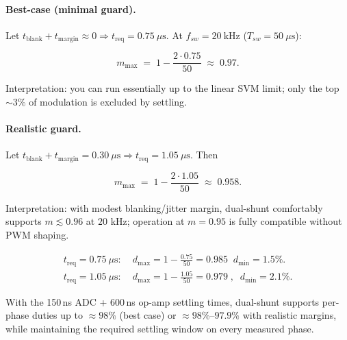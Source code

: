 \documentclass[conference]{IEEEtran}
\begin{document}
\paragraph*{Best-case (minimal guard).}
Let \(t_{\mathrm{blank}}{+}t_{\mathrm{margin}}\!\approx\!0 \Rightarrow t_{\mathrm{req}}=0.75~\mu\text{s}\).
At \(f_{sw}=20~\text{kHz}\) (\(T_{sw}=50~\mu\text{s}\)):

\begin{equation}
m_{\max} \;=\; 1 - \frac{2\cdot 0.75}{50} \;\approx\; \mathbf{0.97}.
\end{equation}

Interpretation: you can run essentially up to the linear SVM limit; only the top \(\sim\!3\%\) of modulation is excluded by settling.

\paragraph*{Realistic guard.}
Let \(t_{\mathrm{blank}}{+}t_{\mathrm{margin}}=0.30~\mu\text{s} \Rightarrow t_{\mathrm{req}}=1.05~\mu\text{s}\).
Then

\begin{equation}
m_{\max} \;=\; 1 - \frac{2\cdot 1.05}{50} \;\approx\; \mathbf{0.958}.
\end{equation}

Interpretation: with modest blanking/jitter margin, dual-shunt comfortably supports \(m\!\lesssim\!0.96\) at \(20\) kHz; operation at \(m=0.95\) is fully compatible without PWM shaping.

\begin{equation}
\begin{aligned}
t_{\mathrm{req}}=0.75~\mu\text{s}: \;& d_{\max}=1-\tfrac{0.75}{50}=0.985\;\; d_{\min}=1.5\%.\\
t_{\mathrm{req}}=1.05~\mu\text{s}: \;& d_{\max}=1-\tfrac{1.05}{50}=0.979\;,\;\; d_{\min}=2.1\%.
\end{aligned}
\end{equation}

With the 150\,ns ADC + 600\,ns op-amp settling times, dual-shunt supports per-phase duties up to \(\approx98\%\) (best case) or \(\approx98\%\)–\(97.9\%\) with realistic margins, while maintaining the required settling window on every measured phase.
\end{document}

